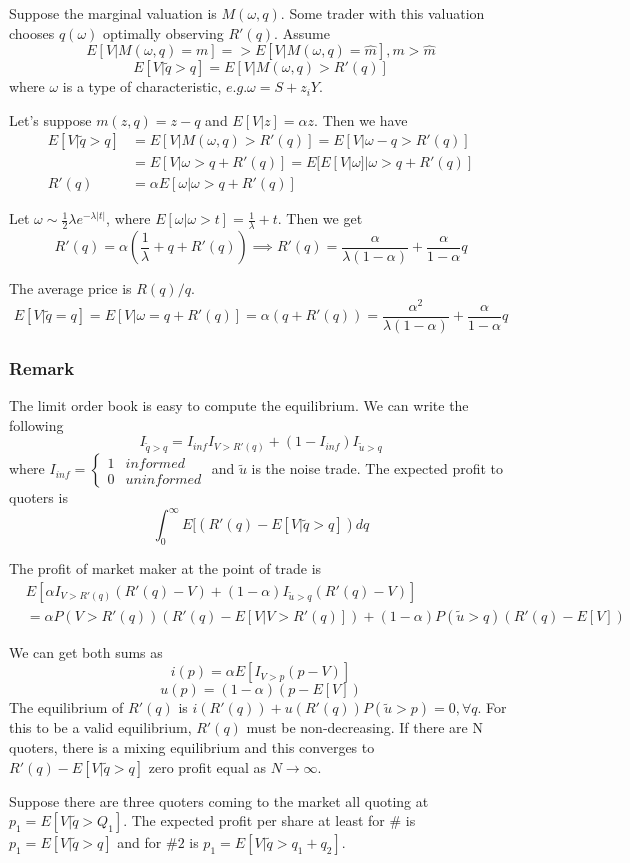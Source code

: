 \documentclass[11pt, a4paper, oneside]{article}
\theoremstyle{definition}
\theoremstyle{proposition}
\theoremstyle{corollary}
\theoremstyle{lemma}
\theoremstyle{theorem}
\begin{document}
Suppose the marginal valuation is $M(\omega, q)$. Some trader with this valuation chooses $q(\omega)$ optimally observing $R'(q)$. Assume $$E[V|M(\omega, q) = m] = > E[V|M(\omega, q) =\hat{m}], m > \hat{m}$$
$$E[V|\tilde{q}> q] = E[V|M(\omega, q) > R'(q)]$$ 
where $\omega$ is a type of characteristic, $e.g. \omega = S + z_iY$. 

Let's suppose $m(z ,q) = z - q$ and $E[V|z ] = \alpha z$. Then we have
\begin{align*}
E[V|\tilde{q} > q] &= E[V|M(\omega, q) > R'(q)] = E[V|\omega - q > R'(q)] \\
&= E[V|\omega > q + R'(q)] = E[E[V|\omega]|\omega > q + R'(q)] \\
R'(q) &= \alpha E[\omega|\omega > q + R'(q)]
\end{align*}

Let $\omega \sim \frac{1}{2}\lambda e^{-\lambda |t|}$, where $E[\omega|\omega > t] = \frac{1}{\lambda} + t$. Then we get
$$R'(q) = \alpha(\frac{1}{\lambda} + q + R'(q))\implies R'(q) = \frac{\alpha}{\lambda(1-\alpha)} + \frac{\alpha}{1- \alpha}q$$

The average price is $R(q)/q$. 
$$E[V|\tilde{q} = q] = E[V|\omega = q + R'(q)] = \alpha(q + R'(q)) = \frac{\alpha^2}{\lambda(1- \alpha)} + \frac{\alpha}{1- \alpha} q$$

\subsubsection*{Remark}
The limit order book is easy to compute the equilibrium. We can write the following
$$I_{\tilde{q} > q} = I_{inf}I_{V > R'(q)} + (1-I_{inf})I_{\tilde{u}>q}$$where $I_{inf} = \begin{cases} 1 & informed \\ 0 & uninformed\end{cases}$ and $\tilde{u}$ is the noise trade. The expected profit to quoters is 
$$\int_0^{\infty} E[(R'(q) - E[V|\tilde{q}> q])dq$$ 

The profit of market maker at the point of trade is
\begin{align*}
&E[\alpha I_{V > R'(q)}(R'(q) - V) + (1-\alpha)I_{\tilde{u} > q}(R'(q) -V)] \\ 
&= \alpha P(V > R'(q))(R'(q) - E[V|V>R'(q)]) + (1- \alpha) P(\tilde{u} > q)(R'(q) - E[V])\end{align*}

We can get both sums as
$$i(p) = \alpha E[I_{V > p}(p- V)]$$
$$u(p) = (1- \alpha)(p - E[V])$$
The equilibrium of $R'(q)$ is $i(R'(q)) + u(R'(q))P(\tilde{u} > p)=0, \forall q$. For this to be a valid equilibrium, $R'(q)$ must be non-decreasing. If there are N quoters, there is a mixing equilibrium and this converges to $R'(q) - E[V|\tilde{q} > q]$ zero profit equal as $N \to \infty$. 

Suppose there are three quoters coming to the market all quoting at $p_1 = E[V|\tilde{q}>Q_1]$. The expected profit per share at least for $\#$ is $p_1 = E[V|\tilde{q} > q]$ and for $\#2$ is $p_1 = E[V|\tilde{q} > q_1 + q_2]$. 
\end{document}
